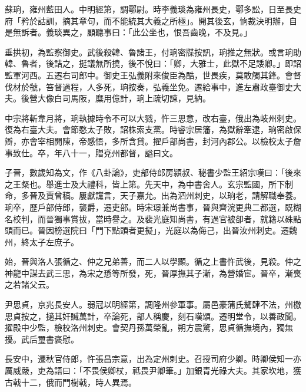 
\begin{pinyinscope}

 蘇珦，雍州藍田人。中明經第，調鄠尉。時李義琰為雍州長史，鄠多訟，日至長史府「矜於詁訓，摘其章句，而不能統其大義之所極」。開其後玄，恦裁決明辦，自是無訴者。義琰異之，顧聽事曰：「此公坐也，恨吾齒晚，不及見。」



 垂拱初，為監察御史。武後殺韓、魯諸王，付珦密牒按訊，珦推之無狀。或言珦助韓、魯者，後詰之，挺議無所撓，後不悅曰：「卿，大雅士，此獄不足諉卿。」即詔監軍河西。五遷右司郎中。御史王弘義附來俊臣為酷，世畏疾，莫敢觸其鋒。會督伐材於虢，笞督過程，人多死，珦按奏，弘義坐免。遷給事中，進左肅政臺御史大夫。後營大像白司馬阪，糜用億計，珦上疏切諫，見納。



 中宗將斬韋月將，珦執據時令不可以大戮，忤三思意，改右臺，俄出為岐州刺史。復為右臺大夫。會節愍太子敗，詔株索支黨。時睿宗居籓，為獄辭牽逮，珦密啟保辯，亦會宰相開陳，帝感悟，多所含貸。擢戶部尚書，封河內郡公。以檢校太子詹事致仕。卒，年八十一，贈兗州都督，謚曰文。



 子晉，數歲知為文，作《八卦論》，吏部侍郎房潁叔、秘書少監王紹宗嘆曰：「後來之王粲也。舉進士及大禮科，皆上第。先天中，為中書舍人。玄宗監國，所下制命，多晉及賈曾稿。屢獻讜言，天子嘉允。出為泗州刺史，以珦老，請解職奉養。珦卒，歷戶部侍郎，襲爵，遷吏部。時宋璟兼尚書事，晉與齊浣更典二都選，既糊名校判，而晉獨事賞拔，當時譽之。及裴光庭知尚書，有過官被卻者，就籍以硃點頭而已。晉因榜選院曰「門下點頭者更擬」，光庭以為侮己，出晉汝州刺史。遷魏州，終太子左庶子。



 始，晉與洛人張循之、仲之兄弟善，而二人以學顯。循之上書忤武後，見殺。仲之神龍中謀去武三思，為宋之愻等所發，死，晉厚撫其子漸，為營婚宦。晉卒，漸喪之若諸父云。



 尹思貞，京兆長安人。弱冠以明經第，調隆州參軍事。屬邑豪蒲氏驁肆不法，州檄思貞按之，擿其奸贓萬計，卒論死，部人稱慶，刻石嘆頌。遷明堂令，以善政聞。擢殿中少監，檢校洛州刺史。會契丹孫萬榮亂，朔方震驚，思貞循撫境內，獨無擾。武后璽書褒慰。



 長安中，遷秋官侍郎，忤張昌宗意，出為定州刺史。召授司府少卿。時卿侯知一亦厲威嚴，吏為語曰：「不畏侯卿杖，祗畏尹卿筆。」加銀青光祿大夫。其家坎地，獲古戟十二，俄而門樹戟，時人異焉。




\end{pinyinscope}
